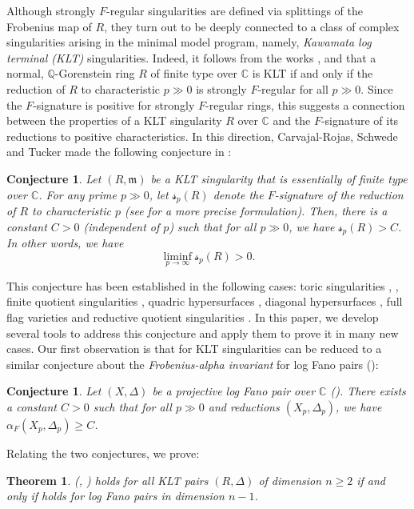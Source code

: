 \documentclass[11pt,reqno]{amsart}
\newcommand{\C}{\mathbb{C}}
\newcommand{\Q}{\mathbb{Q}}
\newcommand{\fm}{\mathfrak{m}}
\numberwithin{equation}{section}
\newtheorem{thm}[prop] {Theorem}
\newtheorem{conj}[prop]{Conjecture}
\theoremstyle{definition}
\newcommand{\FA}{\alpha_{F}}
\newcommand{\s}{\mathscr{s}}
\begin{document}
Although strongly $F$-regular singularities are defined via splittings of the Frobenius map of $R$, they turn out to be deeply connected to a class of complex singularities arising in the minimal model program, namely, \emph{Kawamata log terminal (KLT)} singularities. Indeed, it follows from the works \cite{HaraWatanabeFRegFPure}, \cite{HaraYoshidaGeneralizationOfTightClosure} and \cite{TakagiInterpretationOfMultiplierIdeals} that a normal, $\Q$-Gorenstein ring $R$ of finite type over $\C$ is KLT if and only if the reduction of $R$ to characteristic $p \gg 0$ is strongly $F$-regular for all $p \gg 0$. Since the $F$-signature is positive for strongly $F$-regular rings, this suggests a connection between the properties of a KLT singularity $R$ over $\C$ and the $F$-signature of its reductions to positive characteristics. In this direction, Carvajal-Rojas, Schwede and Tucker made the following conjecture in \cite{CarvajalRojasSchwedeTuckerFundamentalGroups}:
\begin{conj} \label{mainconjintro}
    Let $(R,\fm)$ be a KLT singularity that is essentially of finite type over $\C$. For any prime $p \gg 0$, let $\s_p (R)$ denote the $F$-signature of the reduction of $R$ to characteristic $p $ (see  for a more precise formulation). Then, there is a constant $C >0$ (independent of $p$) such that for all $p \gg 0$, we have $\s_p (R) > C$. In other words, we have
    \[  \liminf_{p \to \infty} \s_p(R) > 0 .\]
\end{conj}

This conjecture has been established in the following cases: toric singularities \cite{SinghFSignatureOfAffineSemigroup}, \cite{VonKorffthesis}, finite quotient singularities \cite{HunekeLeuschkeTwoTheoremsAboutMaximal}, quadric hypersurfaces \cite{TrivediHKDensitfunctionofquadrics}, diagonal hypersurfaces \cite{CaminataShidelerTuckerZermanFsignatureofdiagonalhypersurfaces}, full flag varieties \cite{PandeFrobeniusAlpha} and reductive quotient singularities \cite{TakagiYamaguchiUniformPositivity}. In this paper, we develop several tools to address this conjecture and apply them to prove it in many new cases. Our first observation is that  for KLT singularities can be reduced to a similar conjecture about the \emph{Frobenius-alpha invariant} for log Fano pairs ():

\begin{conj} \label{mainconj2intro}
    Let $(X, \Delta)$ be a projective log Fano pair over $\C$ (). There exists a constant $C>0$ such that for all $p \gg 0$ and reductions $(X_p, \Delta_p)$, we have $\FA (X_p, \Delta_p) \geq C$.
\end{conj}
Relating the two conjectures, we prove:
\begin{thm} \label{alphavssintro}(, )
     holds for all KLT pairs $(R,\Delta)$ of dimension $n \geq 2$ if and only if  holds for log Fano pairs in dimension $n-1$.
\end{thm}
\end{document}
